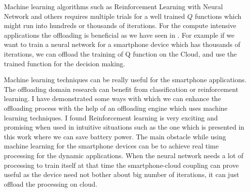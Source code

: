 \documentclass[12pt]{report}
\begin{document}
Machine learning algorithms such as Reinforcement Learning with Neural Network and others requires multiple trials for a well trained $Q$ functions which might run into hundreds or thousands of iterations.
For the compute intensive applications the offloading is beneficial as we have seen in \cite{kumar2010cloud}. For example if we
want to train a neural network for a smartphone device which has thousands of iterations, we
can offload the training of Q function on the Cloud, and use the trained function for the decision making.
\par
Machine learning techniques can be really useful for the smartphone applications. The offloading domain research can benefit from classification or reinforcement learning. I have demonstrated some ways with which we can enhance the offloading process with the help
of an offloading engine which uses machine learning techniques. I found Reinforcement learning is very exciting and promising when used in intuitive situations such as the one which is presented in this work where we can save battery power. 
The main obstacle while using machine learning for the smartphone devices can be to achieve real time processing for the dynamic applications. When the neural network needs a lot of processing to train itself at that time the smartphone-cloud coupling can prove useful as the device need not bother about big number of iterations, it can just offload the processing on cloud. 




\end{document}
